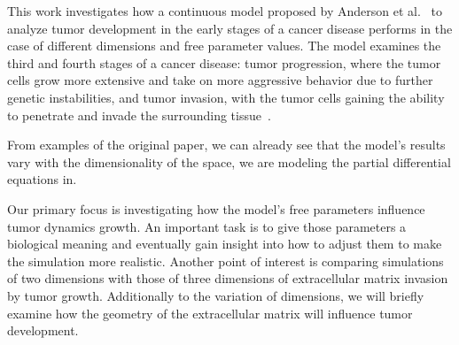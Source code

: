 This work investigates how a continuous model proposed by Anderson et al.~\cite{anderson_continuous_1998,anderson_mathematical_2000} to analyze tumor development in the early stages of a cancer disease performs in the case of different dimensions and free parameter values. The model examines the third and fourth stages of a cancer disease: tumor progression, where the tumor cells grow more extensive and take on more aggressive behavior due to further genetic instabilities, and tumor invasion, with the tumor cells gaining the ability to penetrate and invade the surrounding tissue~\cite{10.1158/2159-8290.CD-21-1059}. 

From examples of the original paper, we can already see that the model's results vary with the dimensionality of the space, we are modeling the partial differential equations in. 

Our primary focus is investigating how the model's free parameters influence tumor dynamics growth. An important task is to give those parameters a biological meaning and eventually gain insight into how to adjust them to make the simulation more realistic. Another point of interest is comparing simulations of two dimensions with those of three dimensions of extracellular matrix invasion by tumor growth. Additionally to the variation of dimensions, we will briefly examine how the geometry of the extracellular matrix will influence tumor development.